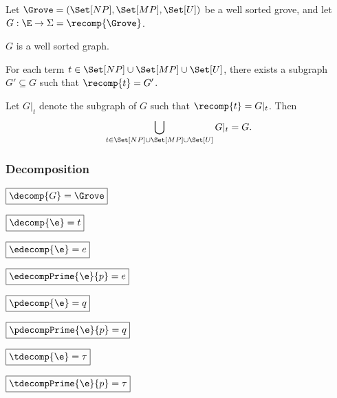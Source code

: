 
Let $\Grove = (\Set[NP], \Set[MP], \Set[U])$ be a well sorted grove,
and let $G : \E \rightarrow \Sigma = \recomp{\Grove}$.

\begin{lemma}
  $G$ is a well sorted graph.
\end{lemma}

\begin{lemma}
  For each term $t \in \Set[NP] \cup \Set[MP] \cup \Set[U]$,
  there exists a subgraph $G' \subseteq G$ such that $\recomp{t} = G'$.
\end{lemma}

\begin{lemma}
  Let $G|_t$ denote the subgraph of $G$ such that $\recomp{t} = G|_t$.
  Then
  \[
    \bigcup_{t \in \Set[NP] \cup \Set[MP] \cup \Set[U]} G|_t = G.
  \]
\end{lemma}



\subsubsection{Decomposition}

\noindent $\boxed{\decomp{G} = \Grove}$
%
\figureDecompositionDefDecomp

\noindent $\boxed{\decomp{\e} = t}$
%
\figureDecompositionDefDecompTerm

\noindent $\boxed{\edecomp{\e} = e}$
%
\figureDecompositionDefEdecomp

\noindent $\boxed{\edecompPrime{\e}{p} = e}$
%
\figureDecompositionDefEdecompPrime

\noindent $\boxed{\pdecomp{\e} = q}$
%
\figureDecompositionDefPdecomp

\noindent $\boxed{\pdecompPrime{\e}{p} = q}$
%
\figureDecompositionDefPdecompPrime

\noindent $\boxed{\tdecomp{\e} = \tau}$
%
\figureDecompositionDefTdecomp

\noindent $\boxed{\tdecompPrime{\e}{p} = \tau}$
%
\figureDecompositionDefTdecompPrime%


